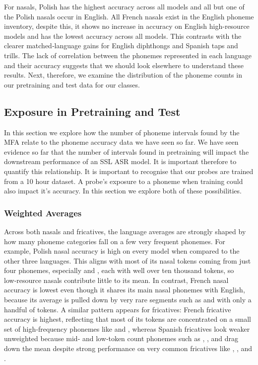 For nasals, Polish has the highest accuracy across all models and all but one of the Polish nasals occur in English. All French nasals exist in the English phoneme inventory, despite this, it shows no increase in accuracy on English high-resource models and has the lowest accuracy across all models. This contrasts with the clearer matched‑language gains for English diphthongs and Spanish taps and trills. The lack of correlation between the phonemes represented in each language and their accuracy suggests that we should look elsewhere to understand these results. Next, therefore, we examine the distribution of the phoneme counts in our pretraining and test data for our classes.%

\subsection{Exposure in Pretraining and Test}
In this section we explore how the number of phoneme intervals found by the MFA relate to the phoneme accuracy data we have seen so far. We have seen evidence so far that the number of intervals found in pretraining will impact the downstream performance of an SSL ASR model. It is important therefore to quantify this relationship. It is important to recognise that our probes are trained from a 10 hour dataset. A probe's exposure to a phoneme when training could also impact it's accuracy. In this section we explore both of these possibilities.
\subsubsection{Weighted Averages}

\iffalse

Across both nasals and fricatives, the language averages are strongly shaped by how many phoneme categories fall on a few very frequent phonemes. For example, Polish nasal accuracy is high on every model when compared to the other three languages. This aligns with most of its nasal tokens coming from just four phonemes, especially \textipa{|[{n}} and , each with well over ten thousand tokens, so low‑resource nasals contribute little to its mean. In contrast, French nasal accuracy is lowest even though it shares its main nasal phonemes with English, because its average is pulled down by very rare segments such as  and  with only a handful of tokens. A similar pattern appears for fricatives: French fricative accuracy is highest, reflecting that most of its tokens are concentrated on a small set of high‑frequency phonemes like  and , whereas Spanish fricatives look weaker unweighted because mid‑ and low‑token count phonemes such as , , and  drag down the mean despite strong performance on very common fricatives like , , and .

